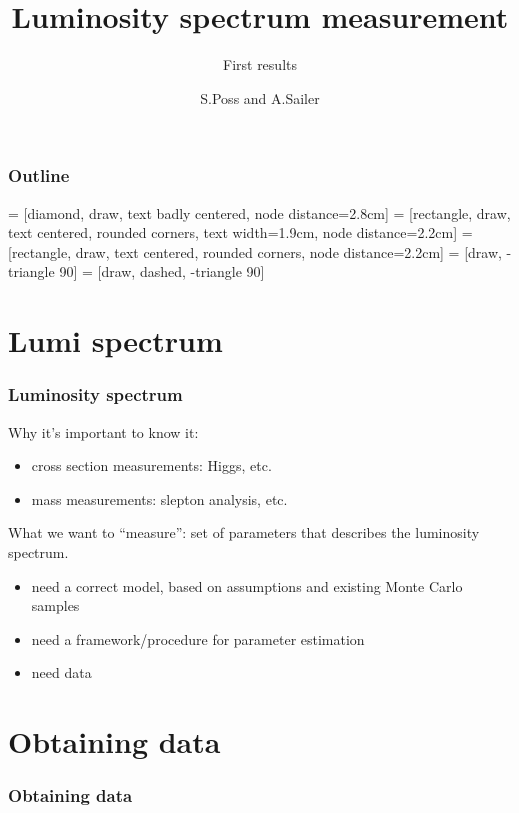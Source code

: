 \documentclass[handout]{beamer}
\author{S.Poss and A.Sailer}
\title{Luminosity spectrum measurement}
\subtitle{First results}
\begin{document}
\begin{frame}
\titlepage
\end{frame}
\begin{frame}
\frametitle{Outline}
\tableofcontents
\end{frame}
 = [diamond, draw, text badly centered, node distance=2.8cm]
 = [rectangle, draw, text centered, rounded corners, text width=1.9cm, node distance=2.2cm]
 = [rectangle, draw, text centered, rounded corners, node distance=2.2cm]
 = [draw, -triangle 90]
 = [draw, dashed, -triangle 90]
\section{Lumi spectrum}
\begin{frame}
\frametitle{Luminosity spectrum}
Why it's important to know it:
\begin{itemize}
\item cross section measurements: Higgs, etc.
\item mass measurements: slepton analysis, etc.
\end{itemize}
What we want to ``measure'': set of parameters that describes the luminosity
spectrum.
\begin{itemize}
\item need a correct model, based on assumptions and existing Monte Carlo
samples
\item need a framework/procedure for parameter estimation
\item need data 
\end{itemize}
\end{frame}
\section{Obtaining data}
\begin{frame}
\frametitle{Obtaining data}
\begin{figure}[h]
\end{figure}
\end{frame}
\end{document}
